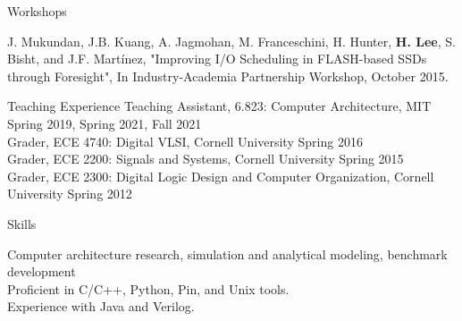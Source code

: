 \documentclass{resume} %
\begin{document}

\begin{rSection}{Workshops}

J. Mukundan, J.B. Kuang, A. Jagmohan, M. Franceschini, H. Hunter, {\bf H. Lee}, S. Bisht, and J.F. Martínez, "Improving I/O Scheduling in FLASH-based SSDs through Foresight", In Industry-Academia Partnership Workshop, October 2015.

\end{rSection}


\begin{rSection}{Teaching Experience}
Teaching Assistant, 6.823: Computer Architecture, MIT \hfill {Spring 2019, Spring 2021, Fall 2021} \\
Grader, ECE 4740: Digital VLSI, Cornell University \hfill {Spring 2016} \\
Grader, ECE 2200: Signals and Systems, Cornell University \hfill {Spring 2015} \\
Grader, ECE 2300: Digital Logic Design and Computer Organization, Cornell University \hfill{Spring 2012}

\end{rSection}


\begin{rSection}{Skills}

Computer architecture research, simulation and analytical modeling, benchmark development \\
Proficient in C/C++, Python, Pin, and Unix tools. \\
Experience with Java and Verilog.

\end{rSection}








\end{document}
